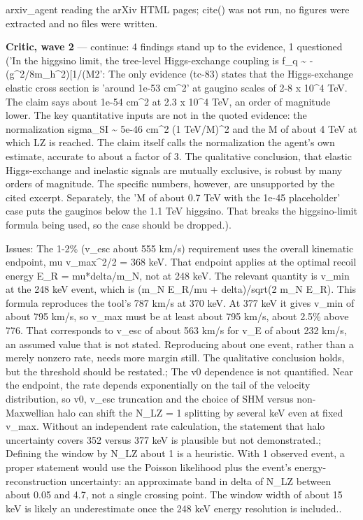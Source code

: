 \documentclass[11pt,a4paper]{article}
\begin{document}
arxiv\_agent reading the arXiv HTML pages; cite() was not run, no figures were extracted and no files were written.

\textbf{Critic, wave 2} --- continue: 4 findings stand up to the evidence, 1 questioned ('In the higgsino limit, the tree-level Higgs-exchange coupling is f\_q \textasciitilde{} -(g\textasciicircum{}2/8m\_h\textasciicircum{}2)[1/(M2': The only evidence (tc-83) states that the Higgs-exchange elastic cross section is 'around 1e-53 cm\textasciicircum{}2' at gaugino scales of 2-8 x 10\textasciicircum{}4 TeV. The claim says about 1e-54 cm\textasciicircum{}2 at 2.3 x 10\textasciicircum{}4 TeV, an order of magnitude lower. The key quantitative inputs are not in the quoted evidence: the normalization sigma\_SI \textasciitilde{} 5e-46 cm\textasciicircum{}2 (1 TeV/M)\textasciicircum{}2 and the M of about 4 TeV at which LZ is reached. The claim itself calls the normalization the agent's own estimate, accurate to about a factor of 3. The qualitative conclusion, that elastic Higgs-exchange and inelastic signals are mutually exclusive, is robust by many orders of magnitude. The specific numbers, however, are unsupported by the cited excerpt. Separately, the 'M of about 0.7 TeV with the 1e-45 placeholder' case puts the gauginos below the 1.1 TeV higgsino. That breaks the higgsino-limit formula being used, so the case should be dropped.).

Issues: The 1-2\% (v\_esc about 555 km/s) requirement uses the overall kinematic endpoint, mu v\_max\textasciicircum{}2/2 = 368 keV. That endpoint applies at the optimal recoil energy E\_R = mu*delta/m\_N, not at 248 keV. The relevant quantity is v\_min at the 248 keV event, which is (m\_N E\_R/mu + delta)/sqrt(2 m\_N E\_R). This formula reproduces the tool's 787 km/s at 370 keV. At 377 keV it gives v\_min of about 795 km/s, so v\_max must be at least about 795 km/s, about 2.5\% above 776. That corresponds to v\_esc of about 563 km/s for v\_E of about 232 km/s, an assumed value that is not stated. Reproducing about one event, rather than a merely nonzero rate, needs more margin still. The qualitative conclusion holds, but the threshold should be restated.; The v0 dependence is not quantified. Near the endpoint, the rate depends exponentially on the tail of the velocity distribution, so v0, v\_esc truncation and the choice of SHM versus non-Maxwellian halo can shift the N\_LZ = 1 splitting by several keV even at fixed v\_max. Without an independent rate calculation, the statement that halo uncertainty covers 352 versus 377 keV is plausible but not demonstrated.; Defining the window by N\_LZ about 1 is a heuristic. With 1 observed event, a proper statement would use the Poisson likelihood plus the event's energy-reconstruction uncertainty: an approximate band in delta of N\_LZ between about 0.05 and 4.7, not a single crossing point. The window width of about 15 keV is likely an underestimate once the 248 keV energy resolution is included..
\end{document}
